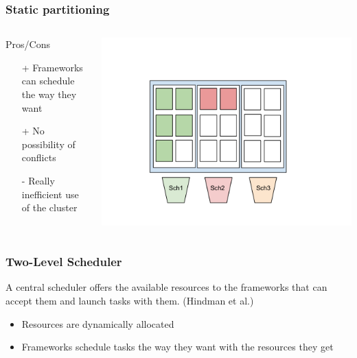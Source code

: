 \documentclass[notes=hide]{beamer}
\begin{document}
  \begin{frame}
    \frametitle{Static partitioning}
       \begin{columns}[T]
       \begin{column}{.5\textwidth}
        \begin{block}{Pros/Cons}

            \begin{itemize}
              \item[+] Frameworks can schedule the way they want 
              \item[+] No possibility of conflicts
              \item[-] Really inefficient use of the cluster
            \end{itemize}
        \end{block}
        \end{column}
        \begin{column}{.6\textwidth}
         \includegraphics[trim = 40mm 30mm 30mm 40mm,clip,scale=0.30,natwidth=960,natheight=720]{StaticPartitioning-slides.png}
        \end{column}
      \end{columns}
  \end{frame}

  \note{}

  \begin{frame}
    \frametitle{Two-Level Scheduler}
    \begin{definition}
      A central scheduler offers the available resources to
      the frameworks that can accept them and launch tasks
      with them. (Hindman et al.)  
    \end{definition}
    \begin{itemize}
      \item Resources are dynamically allocated
      \item Frameworks schedule tasks the way they want
        with the resources they get
    \end{itemize}
  \end{frame}
\end{document}
